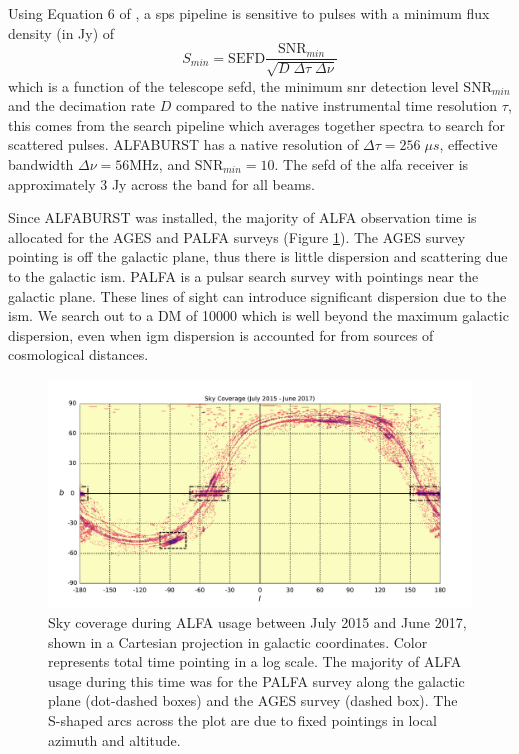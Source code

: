 \documentclass[a4paper,fleqn,usenatbib]{mnras}
\begin{document}
Using Equation 6 of \cite{2015MNRAS.452.1254K}, a \gls*{sps} pipeline is
sensitive to pulses with a minimum flux density (in Jy) of
%
\begin{equation}
S_{min} = \textrm{SEFD} \frac{\textrm{SNR}_{min}}{\sqrt{D \; \Delta \tau \;
\Delta \nu}}
\end{equation}
%
which is a function of the telescope \gls*{sefd}, the minimum \gls*{snr}
detection level $\textrm{SNR}_{min}$ and the decimation rate $D$ compared to the
native instrumental time resolution $\tau$, this comes from the search pipeline
which averages together spectra to search for scattered pulses. ALFABURST has a
native resolution of $\Delta \tau = 256 \; \mu s$, effective bandwidth $\Delta
\nu = 56 \textrm{MHz}$, and $\textrm{SNR}_{min} = 10$. The \gls*{sefd} of the
\gls*{alfa} receiver is approximately 3 Jy across the band for all beams.



Since ALFABURST was installed, the majority of ALFA observation time is
allocated for the AGES \citep{2006MNRAS.371.1617A} and PALFA
\citep{2006ApJ...637..446C} surveys (Figure \ref{fig:sky_coverage}).  The AGES
survey pointing is off the galactic plane, thus there is little dispersion and
scattering due to the galactic \gls*{ism}. PALFA is a pulsar search survey with
pointings near the galactic plane. These lines of sight can introduce
significant dispersion due to the \gls*{ism}. We search out to a DM of 10000
which is well beyond the maximum galactic dispersion, even when \gls*{igm}
dispersion is accounted for from sources of cosmological distances.

\begin{figure}
    \includegraphics[width=1.0\linewidth]{figures/cartview_sky_coverage.pdf}
    \caption{Sky coverage during ALFA usage between July 2015 and June 2017,
    shown in a Cartesian projection in galactic coordinates. Color represents
    total time pointing in a log scale. The majority of ALFA usage during this
    time was for the PALFA survey along the galactic plane (dot-dashed boxes)
    and the AGES survey (dashed box).  The S-shaped arcs across the plot are due
    to fixed pointings in local azimuth and altitude.
    }
    \label{fig:sky_coverage}
\end{figure}
\end{document}
